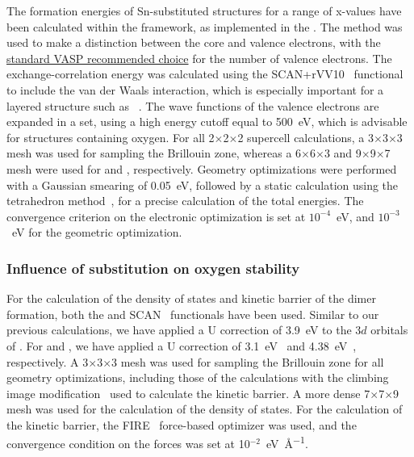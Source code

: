 \begin{refsection}
The formation energies of Sn-substituted structures for a range of x-values have been calculated within the  framework, as implemented in the . The  method was used to make a distinction between the core and valence electrons, with the \href{https://cms.mpi.univie.ac.at/vasp/vasp/Recommended_PAW_potentials_DFT_calculations_using_vasp_5_2.html}{standard VASP recommended choice} for the number of valence electrons. The exchange-correlation energy was calculated using the SCAN+rVV10~\cite{Sun2015, Peng2016} functional to include the van der Waals interaction, which is especially important for a layered structure such as ~\cite{Govaerts2013}. The wave functions of the valence electrons are expanded in a  set, using a high energy cutoff equal to 500~\si{\electronvolt}, which is advisable for structures containing oxygen. For all 2$\times$2$\times$2 supercell calculations, a 3$\times$3$\times$3  mesh was used for sampling the Brillouin zone, whereas a 6$\times$6$\times$3 and 9$\times$9$\times$7 mesh were used for  and , respectively. Geometry optimizations were performed with a Gaussian smearing of 0.05~\si{\electronvolt}, followed by a static calculation using the tetrahedron method~\cite{Blochl1994a}, for a precise calculation of the total energies. The convergence criterion on the electronic optimization is set at $10^{-4}$~\si{\electronvolt}, and $10^{-3}$~\si{\electronvolt} for the geometric optimization. 

 \label{appendix:sec-substitutions} 
\subsubsection{Influence of  substitution on oxygen stability} 

For the calculation of the density of states and kinetic barrier of the dimer formation, both the  and SCAN~\cite{Sun2015} functionals have been used. Similar to our previous calculations, we have applied a U correction of 3.9~\si{\electronvolt} to the 3$d$ orbitals of . For  and , we have applied a U correction of 3.1~\si{\electronvolt}~\cite{Richards2017} and 4.38~\si{\electronvolt}~\cite{MP_Li2MoO3}, respectively. A 3$\times$3$\times$3  mesh was used for sampling the Brillouin zone for all geometry optimizations, including those of the  calculations with the climbing image modification~\cite{Henkelman2000a} used to calculate the kinetic barrier. A more dense 7$\times$7$\times$9 mesh was used for the calculation of the density of states. For the calculation of the kinetic barrier, the FIRE~\cite{Bitzek2006} force-based optimizer was used, and the convergence condition on the forces was set at 10$^{-2}$~\si{\electronvolt\per\angstrom}.


\end{refsection}
